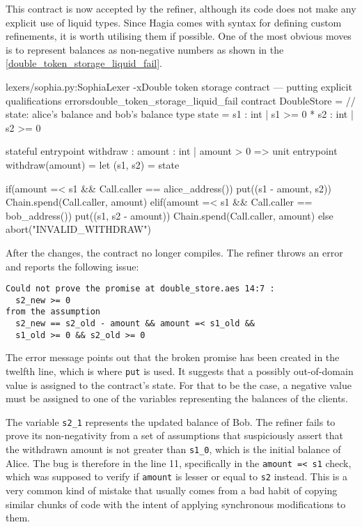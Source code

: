 This contract is now accepted by the refiner, although its code does not make
any explicit use of liquid types. Since Hagia comes with syntax for defining
custom refinements, it is worth utilising them if possible. One of the most
obvious moves is to represent balances as non-negative numbers as shown in the
\autoref{double_token_storage_liquid_fail}.

\begin{code}[H]{lexers/sophia.py:SophiaLexer -x}{Double token storage contract --- putting
    explicit qualifications errors}{double_token_storage_liquid_fail}
contract DoubleStore =
  // state: alice's balance and bob's balance
  type state = {s1 : int | s1 >= 0} * {s2 : int | s2 >= 0}

  stateful
    entrypoint withdraw : {amount : int | amount > 0} => unit
    entrypoint withdraw(amount) =
      let (s1, s2) = state
        
      if(amount =< s1 && Call.caller == alice_address())
        put((s1 - amount, s2))
        Chain.spend(Call.caller, amount)
      elif(amount =< s1 && Call.caller == bob_address())
        put((s1, s2 - amount))
        Chain.spend(Call.caller, amount)
      else
        abort("INVALID_WITHDRAW")
\end{code}

After the changes, the contract no longer compiles. The refiner throws an error
and reports the following issue:

\begin{Verbatim}[samepage=true]
Could not prove the promise at double_store.aes 14:7 :
  s2_new >= 0
from the assumption
  s2_new == s2_old - amount && amount =< s1_old &&
  s1_old >= 0 && s2_old >= 0
\end{Verbatim}

The error message points out that the broken promise has been created in the
twelfth line, which is where \texttt{put} is used. It suggests that a possibly
out-of-domain value is assigned to the contract's state. For that to be the
case, a negative value must be assigned to one of the variables representing the
balances of the clients.

The variable \texttt{s2\_1} represents the updated balance of Bob. The refiner
fails to prove its non-negativity from a set of assumptions that suspiciously
assert that the withdrawn amount is not greater than \texttt{s1\_0}, which is
the initial balance of Alice. The bug is therefore in the line 11, specifically
in the \texttt{amount =< s1} check, which was supposed to verify if
\texttt{amount} is lesser or equal to \texttt{s2} instead. This is a very common
kind of mistake that usually comes from a bad habit of copying similar chunks of
code with the intent of applying synchronous modifications to them.

